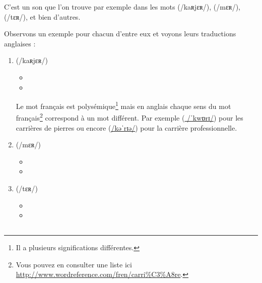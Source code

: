 C'est un son que l'on trouve par exemple dans les mots 
(/kaʀjɛʀ/),  (/mɛʀ/),  (/tɛʀ/), et bien d'autres.

Observons un exemple pour chacun d'entre eux et voyons leurs
traductions anglaises :\par

\begin{enumerate}
\item {} (/kaʀjɛʀ/)
  \begin{itemize}
  \item {}
    \item {}
    \end{itemize}
    Le mot français  est polysémique\footnote{Il a
      plusieurs significations différentes.} mais en anglais chaque
    sens du mot français\footnote{Vous pouvez en consulter une liste
      ici \url{http://www.wordreference.com/fren/carri\%C3\%A8re}.}  correspond à un mot différent. Par exemple
    (\href{https://en.oxforddictionaries.com/definition/quarry}{
      /ˈkwɒrɪ/}) pour les carrières de pierres ou encore 
    (\href{https://en.oxforddictionaries.com/definition/career}{/kəˈrɪə/})
    pour la carrière professionnelle.
\item {} (/mɛʀ/)
  \begin{itemize}
  \item {}
  \item {}
  \end{itemize}

  
\item {} (/tɛʀ/)
  \begin{itemize}
  \item {}
  \item {}
  \end{itemize}
   
\end{enumerate}

\subsection{}\label{subsec:əfr}

